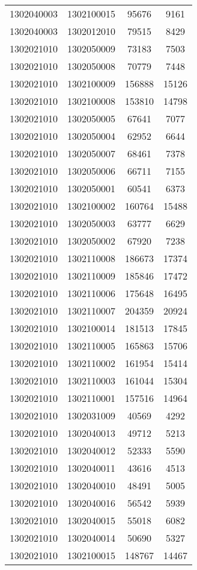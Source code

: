 \begin{longtable}[h]{llcc}
		1302040003 & 1302100015 & 95676 & 9161\\
		1302040003 & 1302012010 & 79515 & 8429\\
		1302021010 & 1302050009 & 73183 & 7503\\
		1302021010 & 1302050008 & 70779 & 7448\\
		1302021010 & 1302100009 & 156888 & 15126\\
		1302021010 & 1302100008 & 153810 & 14798\\
		1302021010 & 1302050005 & 67641 & 7077\\
		1302021010 & 1302050004 & 62952 & 6644\\
		1302021010 & 1302050007 & 68461 & 7378\\
		1302021010 & 1302050006 & 66711 & 7155\\
		1302021010 & 1302050001 & 60541 & 6373\\
		1302021010 & 1302100002 & 160764 & 15488\\
		1302021010 & 1302050003 & 63777 & 6629\\
		1302021010 & 1302050002 & 67920 & 7238\\
		1302021010 & 1302110008 & 186673 & 17374\\
		1302021010 & 1302110009 & 185846 & 17472\\
		1302021010 & 1302110006 & 175648 & 16495\\
		1302021010 & 1302110007 & 204359 & 20924\\
		1302021010 & 1302100014 & 181513 & 17845\\
		1302021010 & 1302110005 & 165863 & 15706\\
		1302021010 & 1302110002 & 161954 & 15414\\
		1302021010 & 1302110003 & 161044 & 15304\\
		1302021010 & 1302110001 & 157516 & 14964\\
		1302021010 & 1302031009 & 40569 & 4292\\
		1302021010 & 1302040013 & 49712 & 5213\\
		1302021010 & 1302040012 & 52333 & 5590\\
		1302021010 & 1302040011 & 43616 & 4513\\
		1302021010 & 1302040010 & 48491 & 5005\\
		1302021010 & 1302040016 & 56542 & 5939\\
		1302021010 & 1302040015 & 55018 & 6082\\
		1302021010 & 1302040014 & 50690 & 5327\\
		1302021010 & 1302100015 & 148767 & 14467\\

\end{longtable}
